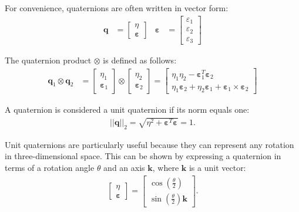For convenience, quaternions are often written in vector form:
\begin{align}
    \bm{q} &= \begin{bmatrix}
        \eta \\
        \bm{\varepsilon}
    \end{bmatrix} & \bm{\varepsilon} &= \begin{bmatrix}
        \varepsilon_1 \\
        \varepsilon_2 \\
        \varepsilon_3
    \end{bmatrix}
\end{align}

The quaternion product \(\otimes\) is defined as follows:
\begin{align}
    \bm{q}_1 \otimes \bm{q}_2 &=
    \begin{bmatrix}
        \eta_1 \\
        \bm{\varepsilon}_1
    \end{bmatrix} \otimes
    \begin{bmatrix}
        \eta_2 \\
        \bm{\varepsilon}_2
    \end{bmatrix} = 
    \begin{bmatrix}
        \eta_1\eta_2 - \bm{\varepsilon}_1^T\bm{\varepsilon}_2 \\
        \eta_1\bm{\varepsilon}_2 + \eta_2\bm{\varepsilon}_1 + \bm{\varepsilon}_1\times\bm{\varepsilon}_2
    \end{bmatrix} 
\end{align}

A quaternion is considered a unit quaternion if its norm equals one:
\begin{align}
    ||\bm{q}||_2 = \sqrt{\eta^2 + \bm{\varepsilon}^T \bm{\varepsilon}} = 1.
\end{align}

Unit quaternions are particularly useful because they can represent any 
rotation in three-dimensional space. This can be shown by expressing a 
quaternion in terms of a rotation angle \(\theta\) and an axis \(\bm{k}\), 
where \(\bm{k}\) is a unit vector:
\begin{align}
    \begin{bmatrix}
        \eta \\
        \bm{\varepsilon}
    \end{bmatrix} = 
    \begin{bmatrix}
        \cos\left(\frac{\theta}{2}\right) \\
        \sin\left(\frac{\theta}{2}\right)\bm{k}
    \end{bmatrix}. \label{eq:quaternion_angle_axis}
\end{align}

